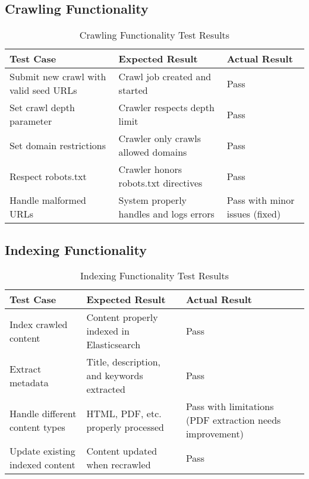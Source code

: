 \documentclass[12pt,a4paper]{report}
\begin{document}
\subsection{Crawling Functionality}
\begin{table}[H]
    \centering
    \begin{tabularx}{\textwidth}{|X|X|X|}
        \hline
        \textbf{Test Case} & \textbf{Expected Result} & \textbf{Actual Result} \\
        \hline
        Submit new crawl with valid seed URLs & Crawl job created and started & Pass \\
        \hline
        Set crawl depth parameter & Crawler respects depth limit & Pass \\
        \hline
        Set domain restrictions & Crawler only crawls allowed domains & Pass \\
        \hline
        Respect robots.txt & Crawler honors robots.txt directives & Pass \\
        \hline
        Handle malformed URLs & System properly handles and logs errors & Pass with minor issues (fixed) \\
        \hline
    \end{tabularx}
    \caption{Crawling Functionality Test Results}
\end{table}

\subsection{Indexing Functionality}
\begin{table}[H]
    \centering
    \begin{tabularx}{\textwidth}{|X|X|X|}
        \hline
        \textbf{Test Case} & \textbf{Expected Result} & \textbf{Actual Result} \\
        \hline
        Index crawled content & Content properly indexed in Elasticsearch & Pass \\
        \hline
        Extract metadata & Title, description, and keywords extracted & Pass \\
        \hline
        Handle different content types & HTML, PDF, etc. properly processed & Pass with limitations (PDF extraction needs improvement) \\
        \hline
        Update existing indexed content & Content updated when recrawled & Pass \\
        \hline
    \end{tabularx}
    \caption{Indexing Functionality Test Results}
\end{table}
\end{document}

